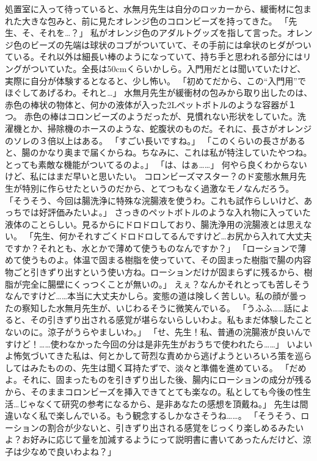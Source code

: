 処置室に入って待っていると、水無月先生は自分のロッカーから、緩衝材に包まれた大きな包みと、前に見たオレンジ色のコロンビーズを持ってきた。
「先生、そ、それを…？」
私がオレンジ色のアダルトグッズを指して言った。オレンジ色のビーズの先端は球状のコブがついていて、その手前には傘状のヒダがついている。それ以外は細長い棒のようになっていて、持ち手と思われる部分にはリングがついていた。全長は50cmくらいかしら。入門用だとは聞いていたけど、実際に自分が体験するとなると、少し怖い。
「初めてだから、この“入門用”でほぐしてあげるわ。それと…」
水無月先生が緩衝材の包みから取り出したのは、赤色の棒状の物体と、何かの液体が入った2Lペットボトルのような容器が１つ。
赤色の棒はコロンビーズのようだったが、見慣れない形状をしていた。洗濯機とか、掃除機のホースのような、蛇腹状のものだ。それに、長さがオレンジのソレの３倍以上はある。
「すごい長いですね。」
「このくらいの長さがあると、腸のかなり奥まで届くからね。ちなみに、これは私が特注していたやつね。とっても素敵な機能がついてるのよ。」
「は、はぁ……」
何やら良くわからないけど、私にはまだ早いと思いたい。
コロンビーズマスター？のド変態水無月先生が特別に作らせたというのだから、とてつもなく過激なモノなんだろう。
「そうそう、今回は腸洗浄に特殊な浣腸液を使うわ。これも試作らしいけど、あっちでは好評価みたいよ。」
さっきのペットボトルのような入れ物に入っていた液体のことらしい。見るからにドロドロしており、腸洗浄用の浣腸液とは思えない。
「先生、何かそれすごくドロドロしてるんですけど…お尻から入れて大丈夫ですか？それとも、水とかで薄めて使うものなんですか？」
「ローションで薄めて使うものよ。体温で固まる樹脂を使っていて、その固まった樹脂で腸の内容物ごと引きずり出すという使い方ね。ローションだけが固まらずに残るから、樹脂が完全に腸壁にくっつくことが無いの。」
えぇ？なんかそれとっても苦しそうなんですけど……本当に大丈夫かしら。変態の道は険しく苦しい。私の顔が曇ったの察知した水無月先生が、いじわるそうに微笑んでいる。
「うふふ……話によると、その引きずり出される感覚が堪らないらしいわよ。私もまだ体験したことないのに。涼子がうらやましいわ。」
「せ、先生！私、普通の浣腸液が良いんですけど！……使わなかった今回の分は是非先生がおうちで使われたら……」
いよいよ怖気づいてきた私は、何とかして苛烈な責めから逃げようといろいろ策を巡らしてはみたものの、先生は聞く耳持たずで、淡々と準備を進めている。
「だめよ。それに、固まったものを引きずり出した後、腸内にローションの成分が残るから、そのままコロンビーズを挿入できてとても楽なの。私としても今後の性生活…じゃなくて研究の参考になるから、是非あなたの感想を頂戴ね。」
先生は間違いなく私で楽しんでいる。もう観念するしかなさそうね……。
「そうそう、ローションの割合が少ないと、引きずり出される感覚をじっくり楽しめるみたいよ？お好みに応じて量を加減するようにって説明書に書いてあったんだけど、涼子は少なめで良いわよね？」
